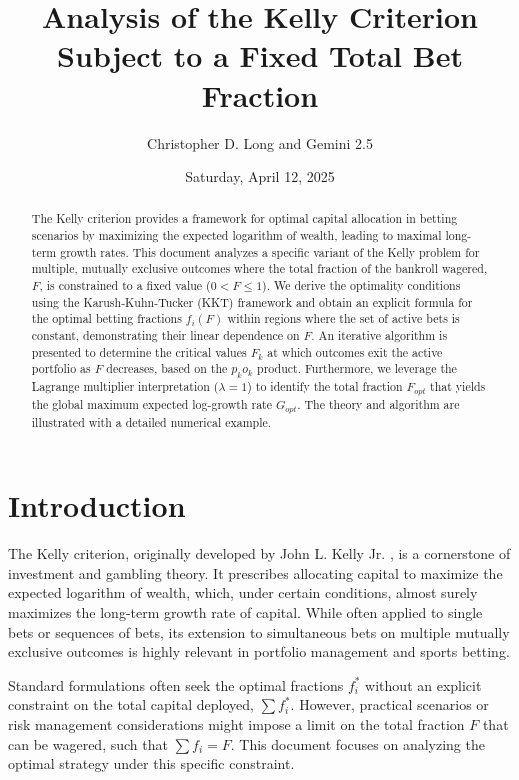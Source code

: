 \documentclass[11pt, letterpaper]{article}
\title{Analysis of the Kelly Criterion Subject to a Fixed Total Bet Fraction}
\author{Christopher D. Long and Gemini 2.5}
\date{Saturday, April 12, 2025} %
\theoremstyle{definition}
\begin{document}
\maketitle

\begin{abstract}
The Kelly criterion provides a framework for optimal capital allocation in betting scenarios by maximizing the expected logarithm of wealth, leading to maximal long-term growth rates. This document analyzes a specific variant of the Kelly problem for multiple, mutually exclusive outcomes where the total fraction of the bankroll wagered, $F$, is constrained to a fixed value ($0 < F \le 1$). We derive the optimality conditions using the Karush-Kuhn-Tucker (KKT) framework and obtain an explicit formula for the optimal betting fractions $f_i(F)$ within regions where the set of active bets is constant, demonstrating their linear dependence on $F$. An iterative algorithm is presented to determine the critical values $F_k$ at which outcomes exit the active portfolio as $F$ decreases, based on the $p_k o_k$ product. Furthermore, we leverage the Lagrange multiplier interpretation ($\lambda=1$) to identify the total fraction $F_{opt}$ that yields the global maximum expected log-growth rate $G_{opt}$. The theory and algorithm are illustrated with a detailed numerical example.
\end{abstract}

\section{Introduction}

The Kelly criterion, originally developed by John L. Kelly Jr. \cite{Kelly1956}, is a cornerstone of investment and gambling theory. It prescribes allocating capital to maximize the expected logarithm of wealth, which, under certain conditions, almost surely maximizes the long-term growth rate of capital. While often applied to single bets or sequences of bets, its extension to simultaneous bets on multiple mutually exclusive outcomes is highly relevant in portfolio management and sports betting.

Standard formulations often seek the optimal fractions $f_i^*$ without an explicit constraint on the total capital deployed, $\sum f_i^*$. However, practical scenarios or risk management considerations might impose a limit on the total fraction $F$ that can be wagered, such that $\sum f_i = F$. This document focuses on analyzing the optimal strategy under this specific constraint.
\end{document}
